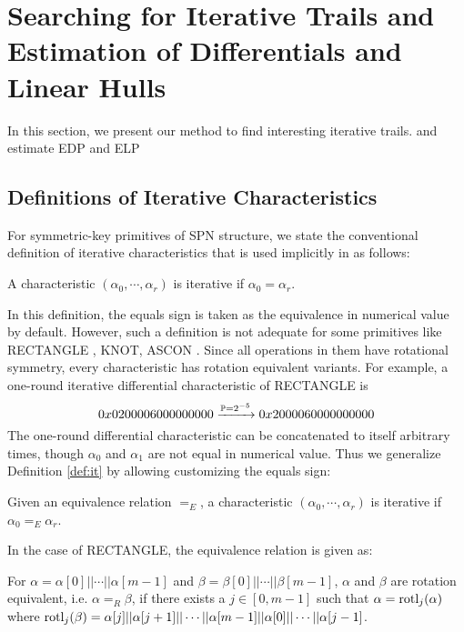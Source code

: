 \section{Searching for Iterative Trails and Estimation of Differentials and Linear Hulls\label{sec:method}}

In this section, we present our method to find interesting iterative trails. and estimate EDP and ELP 

\subsection{Definitions of Iterative Characteristics}\label{sec:def-it}

For symmetric-key primitives of SPN structure, we state the conventional definition of iterative characteristics that is used implicitly in \cite{wang2008differential,liu2019iterative} as follows:
\begin{definition}\label{def:it}
	A characteristic $(\alpha_0,\cdots,\alpha_r)$ is iterative if $\alpha_0=\alpha_r$.
\end{definition}

In this definition, the equals sign is taken as the equivalence in numerical value by default. However, such a definition is not adequate for some primitives like RECTANGLE \cite{zhang2015rectangle}, KNOT, ASCON \cite{dobraunig2016ascon}. Since all operations in them have rotational symmetry, every characteristic has rotation equivalent variants. For example, a one-round iterative differential characteristic of RECTANGLE \cite{zhang2015rectangle} is
\[
	0x 0200 0060 0000 0000\xrightarrow{\mathbb{P}=2^{-5}}0x 2000 0600 0000 0000
\]
The one-round differential characteristic can be concatenated to itself arbitrary times, though $\alpha_0$ and $\alpha_1$ are not equal in numerical value. Thus we generalize Definition \ref{def:it} by allowing customizing the equals sign:
\begin{definition}\label{def:git}
	Given an equivalence relation $=_E$, a characteristic $(\alpha_0,\cdots,\alpha_r)$ is iterative if $\alpha_0=_E\alpha_r$.
\end{definition}
In the case of RECTANGLE, the equivalence relation is given as:

\begin{definition}
	For $\alpha=\alpha[0]||\cdots||\alpha[m-1]$ and $\beta=\beta[0]||\cdots||\beta[m-1]$, $\alpha$ and $\beta$ are rotation equivalent, i.e. $\alpha=_R\beta$, if there exists a $j\in[0,m-1]$ such that $\alpha=\text{rotl}_j(\alpha)$ where $\text{rotl}_j(\beta)=\alpha[j]||\alpha[j+1]||\cdots||\alpha[m-1]||\alpha[0]||\cdots||\alpha[j-1]$. 
\end{definition}

